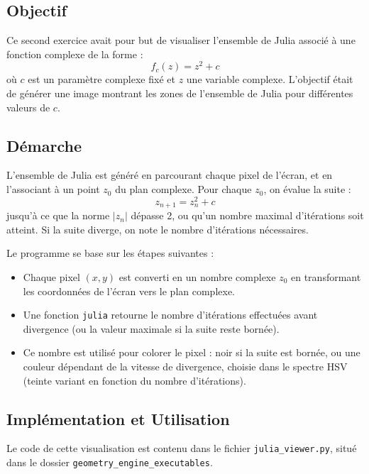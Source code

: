 \documentclass[a4paper,12pt]{article}
\begin{document}

\subsection*{Objectif}

Ce second exercice avait pour but de visualiser l'ensemble de Julia associé à une fonction complexe de la forme :
\[
f_c(z) = z^2 + c
\]
où \(c\) est un paramètre complexe fixé et \(z\) une variable complexe. L'objectif était de générer une image montrant les zones de l'ensemble de Julia pour différentes valeurs de \(c\).

\subsection*{Démarche}

L'ensemble de Julia est généré en parcourant chaque pixel de l'écran, et en l'associant à un point \(z_0\) du plan complexe. Pour chaque \(z_0\), on évalue la suite :
\[
z_{n+1} = z_n^2 + c
\]
jusqu'à ce que la norme \(|z_n|\) dépasse 2, ou qu’un nombre maximal d’itérations soit atteint. Si la suite diverge, on note le nombre d’itérations nécessaires.

Le programme se base sur les étapes suivantes :

\begin{itemize}
    \item Chaque pixel \((x, y)\) est converti en un nombre complexe \(z_0\) en transformant les coordonnées de l'écran vers le plan complexe.
    \item Une fonction \texttt{julia} retourne le nombre d’itérations effectuées avant divergence (ou la valeur maximale si la suite reste bornée).
    \item Ce nombre est utilisé pour colorer le pixel : noir si la suite est bornée, ou une couleur dépendant de la vitesse de divergence, choisie dans le spectre HSV (teinte variant en fonction du nombre d’itérations).
\end{itemize}

\subsection*{Implémentation et Utilisation}

Le code de cette visualisation est contenu dans le fichier \texttt{julia\_viewer.py}, situé dans le dossier \texttt{geometry\_engine\_executables}.
\end{document}
